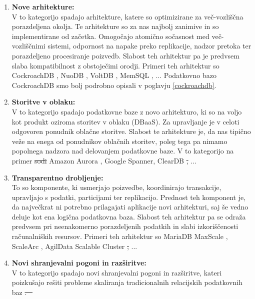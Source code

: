 \documentclass[a4paper, 12pt]{book}
\providecommand{\DIFaddtex}[1]{{\protect\color{blue}\uwave{#1}}} %
\providecommand{\DIFdeltex}[1]{{\protect\color{red}\sout{#1}}}                      %
\providecommand{\DIFaddbegin}{} %
\providecommand{\DIFaddend}{} %
\providecommand{\DIFdelbegin}{} %
\providecommand{\DIFdelend}{} %
\providecommand{\DIFadd}[1]{\texorpdfstring{\DIFaddtex{#1}}{#1}} %
\providecommand{\DIFdel}[1]{\texorpdfstring{\DIFdeltex{#1}}{}} %
\newcommand{\DIFscaledelfig}{0.5}
\newlength{\DIFdelgraphicswidth} %
\newlength{\DIFdelgraphicsheight} %
\newcommand{\DIFaddincludegraphics}[2][]{{\color{blue}\fbox{\DIFOincludegraphics[#1]{#2}}}} %
\newcommand{\DIFdelincludegraphics}[2][]{%
\sbox{\DIFdelgraphicsbox}{\DIFOincludegraphics[#1]{#2}}%
\settoboxwidth{\DIFdelgraphicswidth}{\DIFdelgraphicsbox} %
\settoboxtotalheight{\DIFdelgraphicsheight}{\DIFdelgraphicsbox} %
\scalebox{\DIFscaledelfig}{%
\parbox[b]{\DIFdelgraphicswidth}{\usebox{\DIFdelgraphicsbox}\\[-\baselineskip] \rule{\DIFdelgraphicswidth}{0em}}\llap{\resizebox{\DIFdelgraphicswidth}{\DIFdelgraphicsheight}{%
\setlength{\unitlength}{\DIFdelgraphicswidth}%
\begin{picture}(1,1)%
\thicklines\linethickness{2pt} %
{\color[rgb]{1,0,0}\put(0,0){\framebox(1,1){}}}%
{\color[rgb]{1,0,0}\put(0,0){\line( 1,1){1}}}%
{\color[rgb]{1,0,0}\put(0,1){\line(1,-1){1}}}%
\end{picture}%
}\hspace*{3pt}}} %
} %
\DeclareRobustCommand{\DIFaddbegin}{\DIFOaddbegin \let\includegraphics\DIFaddincludegraphics} %
\DeclareRobustCommand{\DIFaddend}{\DIFOaddend \let\includegraphics\DIFOincludegraphics} %
\DeclareRobustCommand{\DIFdelbegin}{\DIFOdelbegin \let\includegraphics\DIFdelincludegraphics} %
\DeclareRobustCommand{\DIFdelend}{\DIFOaddend \let\includegraphics\DIFOincludegraphics} %
\begin{document}
\begin{enumerate}
    \item \textbf{Nove arhitekture:}\\V to kategorijo spadajo arhitekture, katere so optimizirane za več-vozliščna porazdeljena okolja. Te arhitekture so za nas najbolj zanimive in so implementirane od začetka. Omogočajo atomično sočasnost med več-vozliščnimi sistemi, odpornost na napake preko replikacije, nadzor pretoka ter porazdeljeno procesiranje poizvedb. Slabost teh arhitektur pa je predvsem slaba kompatibilnost z obstoječimi orodji. Primeri teh arhitektur so CockroachDB \cite{cockroachdb/cockroach}, NuoDB \cite{nuodb-home}, VoltDB \cite{voltdb-home}, MemSQL \cite{memsql-home}, ... Podatkovno bazo CockroachDB smo bolj podrobno opisali v poglavju \ref{cockroachdb}.
    \item \textbf{Storitve v oblaku:}\\V to kategorijo spadajo podatkovne baze z novo arhitekturo, ki so na voljo kot produkt oziroma storitev v oblaku (DBaaS). Za upravljanje je v celoti odgovoren ponudnik oblačne storitve. Slabost te arhitekture je, da nas tipično veže na enega od ponudnikov oblačnih storitev, poleg tega pa nimamo popolnega nadzora nad delovanjem podatkovne baze. V to kategorijo na primer \DIFdelbegin \DIFdel{sodi }\DIFdelend \DIFaddbegin \DIFadd{sodijo }\DIFaddend Amazon Aurora \cite{aurora-home}, Google Spanner\cite{spanner-home}, ClearDB \cite{cleardb-home} \DIFdelbegin \DIFdel{, }\DIFdelend ...
    \item \textbf{Transparentno drobljenje:}\\To so komponente, ki usmerjajo poizvedbe, koordinirajo transakcije, upravljajo s podatki, particijami ter replikacijo. Prednost teh komponent je, da največkrat ni potrebno prilagajati aplikacije novi arhitekturi, saj še vedno deluje kot ena logična podatkovna baza. Slabost teh arhitektur pa se odraža predvsem pri neenakomerno porazdeljenih podatkih in slabi izkoriščenosti računalniških resursov. Primeri teh arhitektur so MariaDB MaxScale \cite{mariadb-maxscale-home}, ScaleArc \cite{scalearc-home}, AgilData Scalable Cluster \cite{agiledata-home} \DIFdelbegin \DIFdel{, }\DIFdelend ...
    \item \textbf{Novi shranjevalni pogoni in razširitve:}\\V to kategorijo spadajo novi shranjevalni pogoni in razširitve, kateri poizkušajo rešiti probleme skaliranja tradicionalnih relacijskih podatkovnih baz \DIFdelbegin \DIFdel{. \mbox{%
\cite{Kumar2018Jun}}\hspace{0pt}%
}
\end{enumerate}
\end{document}
